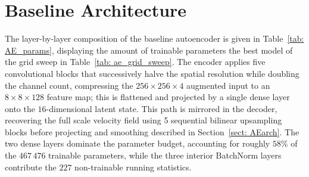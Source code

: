 \section{Baseline Architecture}
\label{app: ae_arch}
The layer-by-layer composition of the baseline autoencoder is given in Table~\ref{tab: AE_params}, displaying the amount of trainable parameters the best model of the grid sweep in Table~\ref{tab: ae_grid_sweep}. The encoder applies five convolutional blocks that successively halve the spatial resolution while doubling the channel count,
compressing the $256\times256\times4$ augmented input to an $8\times8\times128$ feature map; this is flattened and projected by a single dense layer onto the $16$-dimensional latent state. This path is mirrored in the decoder, recovering the full scale velocity field using 5 sequential bilinear upsampling blocks before projecting and smoothing described in Section~\ref{sect: AEarch}. The two dense layers dominate the parameter budget, accounting for roughly
$58\%$ of the $467\,476$ trainable parameters, while the three interior BatchNorm layers contribute the $227$ non-trainable running statistics.

